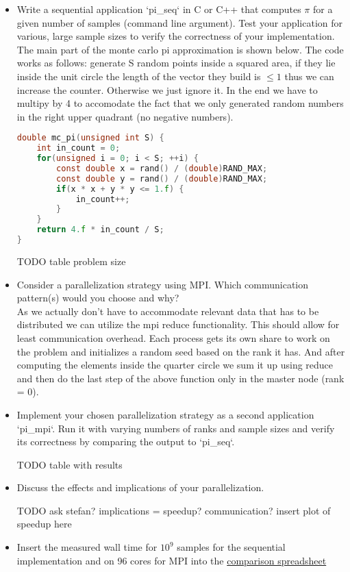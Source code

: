 \documentclass[UTF-8]{article}
\begin{document}
    \begin{itemize}
    	\item Write a sequential application `pi\_seq` in C or C++ that computes $\pi$ for a given number of samples (command line argument). Test your application for various, large sample sizes to verify the correctness of your implementation.
    	\\
    	The main part of the monte carlo pi approximation is shown below. The code works as follows: generate S random points inside a squared area, if they lie inside the unit circle the length of the vector they build is $\le 1$ thus we can increase the counter. Otherwise we just ignore it. In the end we have to multipy by 4 to accomodate the fact that we only generated random numbers in the right upper quadrant (no negative numbers).
    	\begin{lstlisting}[language=c]
double mc_pi(unsigned int S) {
	int in_count = 0;
	for(unsigned i = 0; i < S; ++i) {
		const double x = rand() / (double)RAND_MAX;
		const double y = rand() / (double)RAND_MAX;
		if(x * x + y * y <= 1.f) {
			in_count++;
		}
	}
	return 4.f * in_count / S;
}\end{lstlisting}
    	
    	TODO table problem size
    	
    	
    	\item Consider a parallelization strategy using MPI. Which communication pattern(s) would you choose and why?
    	\\
    	As we actually don't have to accommodate relevant data that has to be distributed we can utilize the mpi reduce functionality. This should allow for least communication overhead. Each process gets its own share to work on the problem and initializes a random seed based on the rank it has. And after computing the elements inside the quarter circle we sum it up using reduce and then do the last step of the above function only in the master node (rank = 0).
    	
    	\item Implement your chosen parallelization strategy as a second application `pi\_mpi`. Run it with varying numbers of ranks and sample sizes and verify its correctness by comparing the output to `pi\_seq`.
    	
    	TODO table with results
    	
    	\item Discuss the effects and implications of your parallelization.
    	
    	TODO ask stefan? implications = speedup? communication? insert plot of speedup here
    	
    	\item Insert the measured wall time for $10^9$ samples for the sequential implementation and on 96 cores for MPI into the  \href{https://docs.google.com/spreadsheets/d/1p6d9F12EtykmI2-7MnHkg0U15UAtaCvWz8Ip92ZEsWo}{comparison spreadsheet}
    \end{itemize}
    
\end{document}

